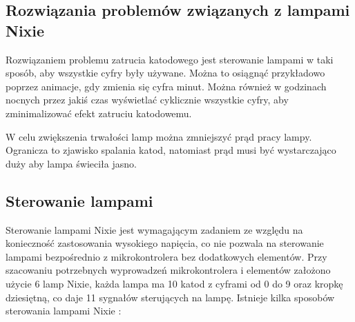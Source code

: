 \documentclass[../main.tex]{subfiles}
\begin{document}
\subsection{Rozwiązania problemów związanych z lampami Nixie}
Rozwiązaniem problemu zatrucia katodowego jest sterowanie lampami w taki sposób, aby wszystkie cyfry były używane.
Można to osiągnąć przykładowo poprzez animacje, gdy zmienia się cyfra minut.
Można również w godzinach nocnych przez jakiś czas wyświetlać cyklicznie wszystkie cyfry, aby zminimalizować efekt zatruciu katodowemu.

W celu zwiększenia trwałości lamp można zmniejszyć prąd pracy lampy. Ogranicza to
 zjawisko spalania katod, natomiast prąd musi być wystarczająco duży aby lampa świeciła jasno.

\subsection{Sterowanie lampami}
\label{sec:sterownie_lampi}

Sterowanie lampami Nixie jest wymagającym zadaniem ze względu na konieczność zastosowania wysokiego napięcia, co nie
pozwala na sterowanie lampami bezpośrednio z mikrokontrolera bez dodatkowych elementów.
Przy szacowaniu potrzebnych wyprowadzeń mikrokontrolera i elementów założono użycie 6 lamp Nixie, każda lampa ma 10 katod z cyframi od 0 do 9 oraz 
kropkę dziesiętną, co daje 11 sygnałów sterujących na lampę.
Istnieje kilka sposobów sterowania lampami Nixie \cite{st:nixie1}:
\end{document}
